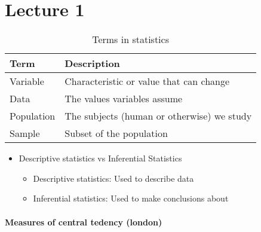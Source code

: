 \documentclass{article}
\newcommand{\paraheading}[1]{\paragraph{#1} \mbox{}} %
\begin{document}
\section{Lecture 1}
\begin{table}[h]
\centering
\caption{Terms in statistics}
\begin{tabular}{|l|l|} 
	\hline
	Term       & Description                                 \\ 
	\hline
	Variable   & Characteristic or value that can change     \\ 
	\hline
	Data       & The values variables assume                 \\ 
	\hline
	Population & The subjects (human or otherwise) we study  \\ 
	\hline
	Sample     & Subset of the population                    \\
	\hline
\end{tabular}
\end{table}
\begin{itemize}
	\item Descriptive statistics vs Inferential Statistics
		\begin{itemize}
			\item Descriptive statistics: Used to describe data
			\item Inferential statistics: Used to make conclusions about  
		\end{itemize}
\end{itemize}
\paraheading{Measures of central tedency (london)}
\end{document}
